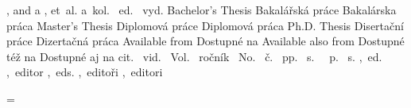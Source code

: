 \ifx\upper\undefined 
   \ifx\sc\undefined \def\upper{\uppercase\expandafter}\else {}\fi
\fi


\def\setbibmark{%
   \ifx\dobibmark\undefined \def\dobibmark{}\fi
   \RetrieveFieldIn{bibmark}\tmp
   \ifx\tmp\empty \RetrieveFieldIn{year}\tmp \edef\tmp{\dobibmark, \tmp}\fi
   \bibmark=\expandafter{\tmp}%
}


            {, and }               { a }               {}
           {, et~al.}             { a~kol.}           {}
        {~ed.}                 {~vyd.}             {}
     {Bachelor's Thesis}    {Bakalářská práce}  {Bakalárska práca}
      {Master's Thesis}      {Diplomová práce}   {Diplomová práca}
      {Ph.D. Thesis}         {Disertační práce}  {Dizertačná práca}
      {Available from }      {Dostupné na }      {}
  {Available also from } {Dostupné též na }  {Dostupné aj na }
       {cit.~}                {vid.~}             {}
         {Vol.~}                {ročník~}           {}
         {No.~}                 {č.~}               {}
       {pp.~}                 {s.~}               {}
      {~p.}                  {~s.}               {}
         {,~ed.}                {,~editor}          {}
        {,~eds.}               {,~editoři}         {,~editori}


\def\bibconjunctionand{\Mtext{bib.and}}
\def\preurl{\Mtext{bib.available}}
\let\predoi=\preurl
\def\postedition{\mtext{bib.edition}}
\def\Inclause{In:~}
\def\prevolume{\mtext{bib.volume}}
\def\prenumber{\mtext{bib.number}}
\def\prepages{\mtext{bib.prepages}}
\def\posteditor{\ifnum0\namecountraw>1 \Mtext{bib.editors}\else\Mtext{bib.editor}\fi}


\chardef\documentlanguage=\language
\def\Mtext#1{\csname mt:#1:\csname lan:\the\documentlanguage\endcsname\endcsname}

\def\setlang#1{\ifx#1\empty \else 
      \expandafter \ifx \csname #1Patt\endcsname \relax
         \opwarning{The language "#1" used in .bib file is unknown}
      \else \language=\csname #1Patt\endcsname
   \fi\fi
}
\ifx\USenglish\undefined  \chardef{} \fi
\let\enPatt=\USenglish  \let\usPatt=\USenglish
\ifx\csPatt \undefined \let\csPatt=\czPatt \else \let\czPatt=\csPatt \fi

